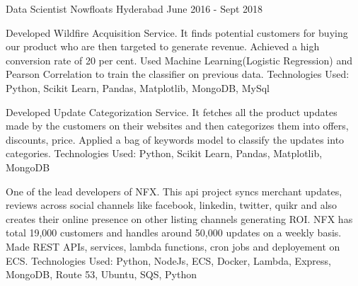 \begin{cventries}
  \cventry
    {Data Scientist} %
    {Nowfloats} %
    {Hyderabad} %
    {June 2016 - Sept 2018} %
    {
      \begin{cvitems} %
        \item {Developed Wildfire Acquisition Service. It finds potential customers for buying our product who are then targeted to generate revenue. Achieved a high conversion rate of 20 per cent. Used Machine Learning(Logistic Regression) and Pearson Correlation to train the classifier on previous data. Technologies Used: Python, Scikit Learn, Pandas, Matplotlib, MongoDB, MySql  }
        \item {Developed Update Categorization Service. It fetches all the product updates made by the customers on their websites and then categorizes them into offers, discounts, price. Applied a bag of keywords model to classify the updates into categories. Technologies Used: Python, Scikit Learn, Pandas, Matplotlib, MongoDB  }
        \item {One of the lead developers of NFX. This api project syncs merchant updates, reviews across social channels like facebook, linkedin, twitter, quikr and also creates their online presence on other listing channels generating ROI. NFX has total 19,000 customers and handles around 50,000 updates on a weekly basis. Made REST APIs, services, lambda functions, cron jobs and deployement on ECS. Technologies Used: Python, NodeJs, ECS, Docker, Lambda, Express, MongoDB, Route 53, Ubuntu, SQS, Python}
      \end{cvitems}
    }

\end{cventries}
